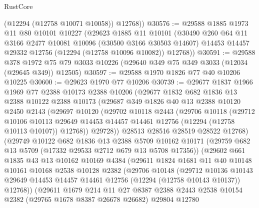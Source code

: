 \begin{lexlean}{RustCore}
\begin{coremodule}
        (@12294 (@12758 @10071 @10058))
        @12768))
@30576 := @29588
    @1885
    @1973
    @11
    @80
    @10101
    @10227
    (@29623
      @1885
      @11
      @10101
      (@30490
        @260
        @64
        @11
        @3166
        @2477
        @10081
        @10096
        (@30500 @3166 @30503 @14607)
        @14453
        @14457
        @29332
        @12756
        (@12294 (@12758 @10096 @10082))
        @12768))
@30591 := @29588
    @378
    @1972
    @75
    @79
    @3033
    @10226
    (@29640 @349 @75 @349 @3033 (@12034 (@29645 @349)) @12505)
@30597 := @29588 @1970 @1826 @77 @40 @10206 @10225
@30600 := @29623 @1970 @77 @10206
@30739 := @29677
    @1837
    @1966
    @1969
    @77
    @2388
    @10173
    @2388
    @10206
    (@29677
      @1832
      @682
      @1836
      @13
      @2388
      @10122
      @2388
      @10173
      (@29687
        @349
        @1826
        @40
        @13
        @2388
        @10120
        @2450
        @2143
        (@29697
          @10120
          (@29702
            @10118
            @2443
            (@29706
              @10118
              (@29712
                @10106
                @10113
                @29649
                @14453
                @14457
                @14461
                @12756
                (@12294 (@12758 @10113 @10107))
                @12768))
            @29728))
        @28513
        @28516
        @28519
        @28522
        @12768)
      (@29749
        @10122
        @682
        @1836
        @13
        @2388
        @5709
        @10162
        @10171
        (@29759 @682 @13 @5709 (@17332 @29533 @2712 @679 @13 @5708 @17356))
        (@29602
          @661
          @1835
          @43
          @13
          @10162
          @10169
          @4384
          (@29611
            @1824
            @1681
            @11
            @40
            @10148
            @10161
            @10168
            @2538
            @10128
            @2382
            (@29706
              @10148
              (@29712
                @10136
                @10143
                @29649
                @14453
                @14457
                @14461
                @12756
                (@12294 (@12758 @10143 @10137))
                @12768))
            (@29611
              @1679
              @214
              @11
              @27
              @8387
              @2388
              @2443
              @2538
              @10154
              @2382
              (@29765 @1678 @8387 @26678 @26682)
              @29804
              @12780

\end{coremodule}
\end{lexlean}
